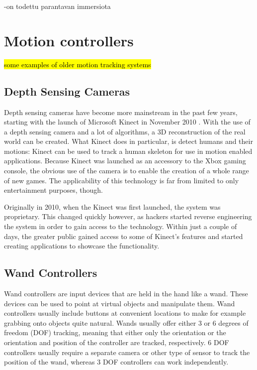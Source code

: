 \documentclass[12pt,a4paper,oneside,pdftex]{report}
\begin{document}
-on todettu parantavan immersiota \cite{PauschQuantifyingImmersion}

\section{Motion controllers}
\label{section:motioncontrollers}

\hl{some examples of older motion tracking systems}


\subsection{Depth Sensing Cameras}
\label{subsection:motion:kinect}

Depth sensing cameras have become more mainstream in the past few years, starting with the launch of Microsoft Kinect \cite{Kinect} in November 2010 \cite{zhang2012microsoft}. With the use of a depth sensing camera and a lot of algorithms, a 3D reconstruction of the real world can be created. What Kinect does in particular, is detect humans and their motions: Kinect can be used to track a human skeleton for use in motion enabled applications. Because Kinect was launched as an accessory to the Xbox gaming console, the obvious use of the camera is to enable the creation of a whole range of new games. The applicability of this technology is far from limited to only entertainment purposes, though.

Originally in 2010, when the Kinect was first launched, the system was proprietary. This changed quickly however, as hackers started reverse engineering the system in order to gain access to the technology. Within just a couple of days, the greater public gained access to some of Kinect's features and started creating applications to showcase the functionality. \cite{giles2010inside}

\subsection{Wand Controllers}
\label{subsection:motion:move}

Wand controllers are input devices that are held in the hand like a wand. These devices can be used to point at virtual objects and manipulate them. Wand controllers usually include buttons at convenient locations to make for example grabbing onto objects quite natural. Wands usually offer either 3 or 6 degrees of freedom (DOF) tracking, meaning that either only the orientation or the orientation and position of the controller are tracked, respectively. 6 DOF controllers usually require a separate camera or other type of sensor to track the position of the wand, whereas 3 DOF controllers can work independently.
\end{document}
